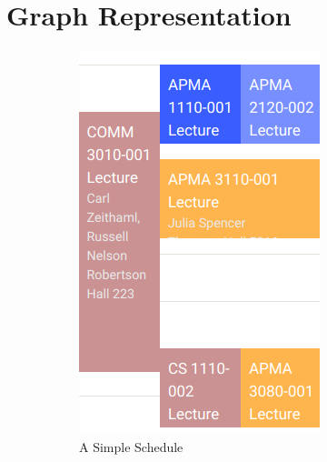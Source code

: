 \documentclass[12pt]{article}
\begin{document}
\section{Graph Representation}
\begin{figure}[H]
    \centering
    \begin{subfigure}{.4\textwidth}
        \centering
        \includegraphics[width=.8\columnwidth]{example1}
        \caption{A Simple Schedule}
        \label{fig:exp1}
    \end{subfigure}%
    \begin{subfigure}{.6\textwidth}
        \centering
        \begin{tikzpicture}[auto, node distance=3.5cm, every loop/.style={},
            thick,main node/.style={circle,draw,font=\sffamily\bfseries\small}]
        

\end{tikzpicture}
\end{subfigure}
\end{figure}
\end{document}

